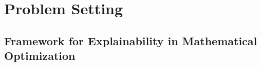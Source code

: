 \documentclass[11pt, a4paper]{article}
\newcommand{\Regie}[1]{\todo[color=white, inline, author=Structure]{#1}}
\newcommand{\I}{{\mathcal{I}}} %
\newcommand{\X}{{\mathcal{X}}} %
\newcommand{\XI}{{\X(I)}}
\begin{document}








\section{Problem Setting\label{sec:setting}}

\subsection{Framework for Explainability in Mathematical Optimization}


\end{document}
